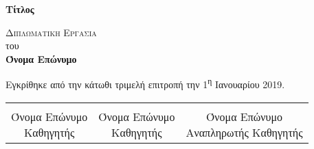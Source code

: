 \begin{titlepage}
	
	\begin{center}
	
	\Huge
    \textbf{Τίτλος}
        
    \vspace{5cm}
    \Large
    \textsc{Διπλωματικη Εργασια}\\
    του\\

    \LARGE
    \textbf{Όνομα Επώνυμο}
    
    \vfill
    \end{center}
    
    Εγκρίθηκε από την κάτωθι τριμελή επιτροπή την 1\textsuperscript{η} Ιανουαρίου 2019.
    \vspace{2cm}
	
	\begin{center}
	\noindent\begin{tabular}{ccc}
		\makebox[0.3\textwidth]{\hrulefill} & 
		\makebox[0.3\textwidth]{\hrulefill} & 
		\makebox[0.3\textwidth]{\hrulefill} \\

		\specialcell{Όνομα Επώνυμο \\ Καθηγητής} & 
		\specialcell{Όνομα Επώνυμο \\ Καθηγητής} & 
		\specialcell{Όνομα Επώνυμο \\ Αναπληρωτής Καθηγητής} \\ [8ex]%
	\end{tabular}
	\end{center}
	
\end{titlepage}